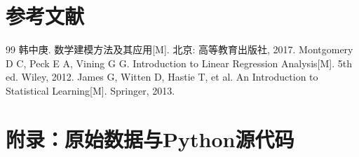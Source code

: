 \documentclass[12pt,a4paper]{article}
\begin{document}
\section{参考文献}

\begin{thebibliography}{99}
 韩中庚. 数学建模方法及其应用[M]. 北京: 高等教育出版社, 2017.
 Montgomery D C, Peck E A, Vining G G. Introduction to Linear Regression Analysis[M]. 5th ed. Wiley, 2012.
 James G, Witten D, Hastie T, et al. An Introduction to Statistical Learning[M]. Springer, 2013.
\end{thebibliography}

\appendix
\section{附录：原始数据与Python源代码}


\end{document}
